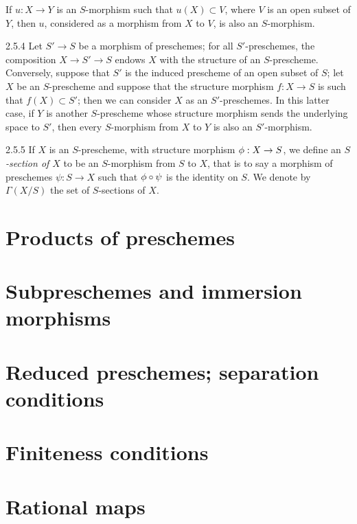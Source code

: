 \documentclass[10pt,oneside]{book}
\begin{document}
If $u:X\to Y$ is an $S$-morphism such that $u(X)\subset V$, where $V$ is
an open subset of $Y$, then $u$, considered as a morphism from $X$ to $V$, is
also an $S$-morphism.

\begin{env}{2.5.4}
\label{env-1.2.5.4}
Let $S'\to S$ be a morphism of preschemes; for all
$S'$-preschemes, the composition $X\to S'\to S$ endows $X$ with the structure of
an $S$-prescheme. Conversely, suppose that $S'$ is the induced prescheme of an
open subset of $S$; let $X$ be an $S$-prescheme and suppose that the structure
morphism $f:X\to S$ is such that $f(X)\subset S'$; then we can consider
$X$ as an $S'$-preschemes. In this latter case, if $Y$ is another $S$-prescheme
whose structure morphism sends the underlying space to $S'$, then every
$S$-morphism from $X$ to $Y$ is also an $S'$-morphism.
\end{env}

\begin{env}{2.5.5}
\label{env-1.2.5.5}
If $X$ is an $S$-prescheme, with structure morphism
$\phi:X\to S$, we define an \emph{$S$-section of $X$} to be an
$S$-morphism from $S$ to $X$, that is to say a morphism of preschemes
$\psi:S\to X$ such that $\phi\circ\psi$ is the identity on $S$.  We
denote by $\Gamma(X/S)$ the set of $S$-sections of $X$.
\end{env}

\section{Products of preschemes}
\label{1-schemes-3}

\section{Subpreschemes and immersion morphisms}
\label{1-schemes-4}

\section{Reduced preschemes; separation conditions}
\label{1-schemes-5}

\section{Finiteness conditions}
\label{1-schemes-6}

\section{Rational maps}
\label{1-schemes-7}
\end{document}
